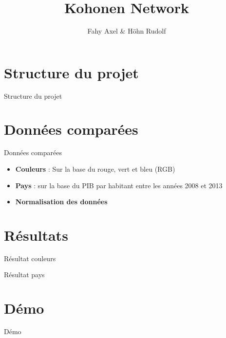 \documentclass[11pt]{beamer}
\author{Fahy Axel \& Höhn Rudolf}
\title{Kohonen Network}
\institute{Algorithmes avancées\\hepia}
\begin{document}
\begin{frame}
\titlepage
\end{frame}

\begin{frame}
\tableofcontents
\end{frame}

\section{Structure du projet}
\begin{frame}{Structure du projet}

\end{frame}

\section{Données comparées}
\begin{frame}{Données comparées}
\begin{itemize}
\item \textbf{Couleurs} : Sur la base du rouge, vert et bleu (RGB)
\item \textbf{Pays} : sur la base du PIB par habitant entre les années 2008 et 2013
\item \textbf{Normalisation des données}
\end{itemize}
\end{frame}

\section{Résultats}
\begin{frame}{Résultat couleurs}

\end{frame}

\begin{frame}{Résultat pays}

\end{frame}

\section{Démo}
\begin{frame}{Démo}
\end{frame}
\end{document}
